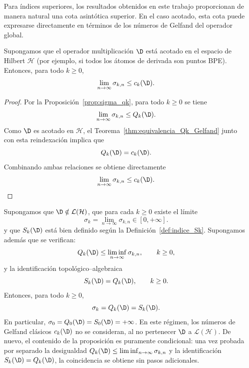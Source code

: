 Para índices superiores, los resultados obtenidos en este trabajo proporcionan de manera natural una cota asintótica superior. En el caso acotado, esta cota puede expresarse directamente en términos de los números de Gelfand del operador global.

\begin{cor}\label{cor:convergencia_qk_condicional}
	Supongamos que el operador multiplicación $\D$ está acotado en el espacio de Hilbert $\mathcal{H}$ (por ejemplo, si todos los átomos de derivada son puntos BPE). Entonces, para todo $k \ge 0$,
	\[
		\lim_{n \to \infty} \sigma_{k,n} \le c_k(\D).
	\]
\end{cor}

\begin{proof}
	Por la Proposición~\ref{prop:sigma_qk}, para todo $k \ge 0$ se tiene
	\[
		\lim_{n \to \infty} \sigma_{k,n} \le Q_k(\D).
	\]
	Como $\D$ es acotado en $\mathcal{H}$, el Teorema~\ref{thm:equivalencia_Qk_Gelfand} junto con esta reindexación implica que
	\[
		Q_k(\D) = c_k(\D).
	\]
	Combinando ambas relaciones se obtiene directamente
	\[
		\lim_{n \to \infty} \sigma_{k,n} \le c_k(\D).
	\]
\end{proof}

\begin{prop}\label{prop:coincidencia_no_acotado}
	Supongamos que $\D\notin\mathcal{L}(\mathcal{H})$, que para cada $k\ge0$ existe el límite
	\[
		\sigma_k=\lim_{n\to\infty}\sigma_{k,n}\in[0,+\infty].
	\]
	y que $S_k(\D)$ está bien definido según la Definición~\ref{def:indice_Sk}. Supongamos además que se verifican:
	\[
		Q_k(\D)\le \liminf_{n\to\infty}\sigma_{k,n},
		\qquad k\ge0,
	\]
	y la identificación topológico--algebraica
	\[
		S_k(\D)=Q_k(\D),
		\qquad k\ge0.
	\]
	Entonces, para todo $k\ge0$,
	\[
		\sigma_{k}=Q_k(\D)=S_k(\D).
	\]
	En particular, $\sigma_0=Q_0(\D)=S_0(\D)=+\infty$. En este régimen, los números de Gelfand clásicos $c_k(\D)$ no se consideran, al no pertenecer $\D$ a $\mathcal{L}(\mathcal{H})$.
	De nuevo, el contenido de la proposición es puramente condicional: una vez probada por separado la desigualdad $Q_k(\D)\le \liminf_{n\to\infty}\sigma_{k,n}$ y la identificación $S_k(\D)=Q_k(\D)$, la coincidencia se obtiene sin pasos adicionales.
\end{prop}

